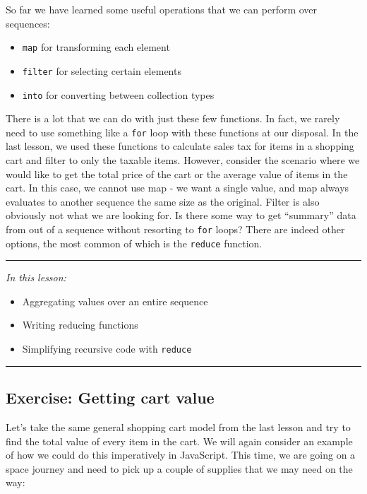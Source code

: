 \documentclass[10pt,twoside,openright]{memoir}
\begin{document}
So far we have learned some useful operations that we can perform over
sequences:

\begin{itemize}
\tightlist
\item
  \texttt{map} for transforming each element
\item
  \texttt{filter} for selecting certain elements
\item
  \texttt{into} for converting between collection types
\end{itemize}

There is a lot that we can do with just these few functions. In fact, we
rarely need to use something like a \texttt{for} loop with these
functions at our disposal. In the last lesson, we used these functions
to calculate sales tax for items in a shopping cart and filter to only
the taxable items. However, consider the scenario where we would like to
get the total price of the cart or the average value of items in the
cart. In this case, we cannot use map - we want a single value, and map
always evaluates to another sequence the same size as the original.
Filter is also obviously not what we are looking for. Is there some way
to get ``summary'' data from out of a sequence without resorting to
\texttt{for} loops? There are indeed other options, the most common of
which is the \texttt{reduce} function.

\begin{center}\rule{0.5\linewidth}{0.5pt}\end{center}

\emph{In this lesson:}

\begin{itemize}
\tightlist
\item
  Aggregating values over an entire sequence
\item
  Writing reducing functions
\item
  Simplifying recursive code with \texttt{reduce}
\end{itemize}

\begin{center}\rule{0.5\linewidth}{0.5pt}\end{center}


\subsection{Exercise: Getting cart value}

Let's take the same general shopping cart model from the last lesson and
try to find the total value of every item in the cart. We will again
consider an example of how we could do this imperatively in JavaScript.
This time, we are going on a space journey and need to pick up a couple
of supplies that we may need on the way:
\end{document}

